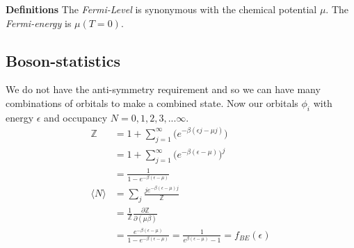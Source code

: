 \documentclass[a4paper, 11pt]{article}
\begin{document}
	\noindent \textbf{Definitions} The \textit{Fermi-Level} is synonymous with the chemical potential $\mu$. The \textit{Fermi-energy} is $\mu(T=0)$. 
	
	
\subsection*{Boson-statistics}
	We do not have the anti-symmetry requirement and so we can have many combinations of orbitals to make a combined state. Now our orbitals $\phi_i$ with energy $\epsilon$ and occupancy $N = 0, 1, 2, 3,... \infty$. 
		\begin{align*}
			\mathbb{Z} &= 1+\sum_{j=1}^\infty \Big(e^{-\beta(\epsilon j-\mu j)}\Big)\\
				&= 1+\sum_{j=1}^\infty \Big(e^{-\beta(\epsilon -\mu )}\Big)^j \\ 
				&= \frac{1}{1-e^{-\beta(\epsilon-\mu)}}\\
			\langle N \rangle &= \sum_j\frac{j e^{-\beta(\epsilon-\mu)j}}{\mathbb{Z}} \\
				&= \frac{1}{\mathbb{Z}}\frac{\partial\mathbb{Z}}{\partial(\mu \beta)} \\ 
				&= \frac{e^{-\beta(\epsilon-\mu)}}{1-e^{-\beta(\epsilon-\mu)}} = \frac{1}{e^{\beta(\epsilon-\mu)}-1} = f_{BE}(\epsilon)
		\end{align*}
	
	
	
	
	
	
	
\end{document}
